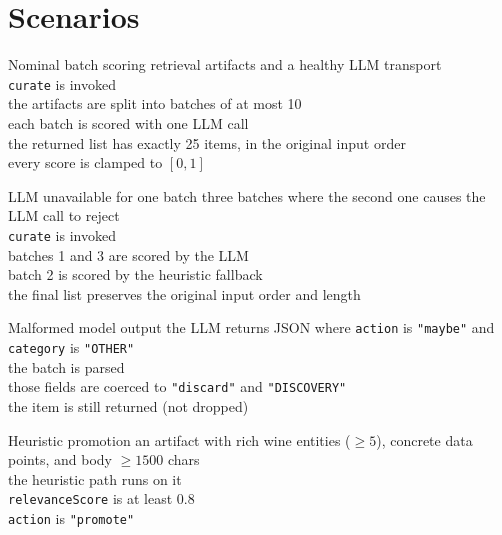 \section{Scenarios}

\begin{scenario}{Nominal batch scoring}
 retrieval artifacts and a healthy LLM transport \\
\When \texttt{curate} is invoked \\
\Then the artifacts are split into batches of at most 10 \\
\And each batch is scored with one LLM call \\
\And the returned list has exactly 25 items, in the original input order \\
\And every score is clamped to \([0,1]\)
\end{scenario}

\begin{scenario}{LLM unavailable for one batch}
\Given three batches where the second one causes the LLM call to reject \\
\When \texttt{curate} is invoked \\
\Then batches 1 and 3 are scored by the LLM \\
\And batch 2 is scored by the heuristic fallback \\
\And the final list preserves the original input order and length
\end{scenario}

\begin{scenario}{Malformed model output}
\Given the LLM returns JSON where \texttt{action} is \texttt{"maybe"} and \texttt{category} is \texttt{"OTHER"} \\
\When the batch is parsed \\
\Then those fields are coerced to \texttt{"discard"} and \texttt{"DISCOVERY"} \\
\And the item is still returned (not dropped)
\end{scenario}

\begin{scenario}{Heuristic promotion}
\Given an artifact with rich wine entities (\(\ge 5\)), concrete data points, and body \(\ge 1500\) chars \\
\When the heuristic path runs on it \\
\Then \texttt{relevanceScore} is at least 0.8 \\
\And \texttt{action} is \texttt{"promote"}
\end{scenario}

